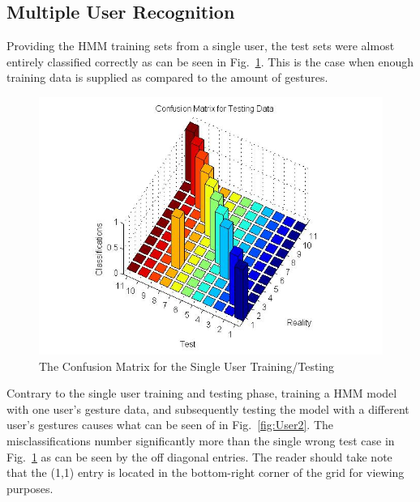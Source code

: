 \documentclass[conference]{IEEEtran}
\newcommand{\FigRef}[1]{Fig.~\ref{fig:#1}}
\begin{document}
\hfill




\subsection{Multiple User Recognition}
Providing the HMM training sets from a single user, the test sets were almost entirely classified correctly as can be seen in \FigRef{User1}. This is the case when enough training data is supplied as compared to the amount of gestures.


\begin{figure}[h]
\begin{center}
\noindent
  \includegraphics[width=\columnwidth]{User1}
  \caption{The Confusion Matrix for the Single User Training/Testing} \label{fig:User1}
\end{center}
\end{figure}

Contrary to the single user training and testing phase, training a HMM model with one user's gesture data, and subsequently testing the model with a different user's gestures causes what can be seen of in \FigRef{User2}. The misclassifications number significantly more than the single wrong test case in \FigRef{User1} as can be seen by the off diagonal entries. The reader should take note that the (1,1) entry is located in the bottom-right corner of the grid for viewing purposes. 
\end{document}
